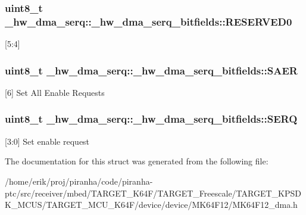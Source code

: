 \subsubsection[{\texorpdfstring{R\+E\+S\+E\+R\+V\+E\+D0}{RESERVED0}}]{\setlength{\rightskip}{0pt plus 5cm}uint8\+\_\+t \+\_\+hw\+\_\+dma\+\_\+serq\+::\+\_\+hw\+\_\+dma\+\_\+serq\+\_\+bitfields\+::\+R\+E\+S\+E\+R\+V\+E\+D0}\hypertarget{struct__hw__dma__serq_1_1__hw__dma__serq__bitfields_ad89ede54427929337a743845e97722fb}{}\label{struct__hw__dma__serq_1_1__hw__dma__serq__bitfields_ad89ede54427929337a743845e97722fb}
\mbox{[}5\+:4\mbox{]} 
\subsubsection[{\texorpdfstring{S\+A\+ER}{SAER}}]{\setlength{\rightskip}{0pt plus 5cm}uint8\+\_\+t \+\_\+hw\+\_\+dma\+\_\+serq\+::\+\_\+hw\+\_\+dma\+\_\+serq\+\_\+bitfields\+::\+S\+A\+ER}\hypertarget{struct__hw__dma__serq_1_1__hw__dma__serq__bitfields_a8cc35592d815f1752d4b73bddc3e80be}{}\label{struct__hw__dma__serq_1_1__hw__dma__serq__bitfields_a8cc35592d815f1752d4b73bddc3e80be}
\mbox{[}6\mbox{]} Set All Enable Requests 
\subsubsection[{\texorpdfstring{S\+E\+RQ}{SERQ}}]{\setlength{\rightskip}{0pt plus 5cm}uint8\+\_\+t \+\_\+hw\+\_\+dma\+\_\+serq\+::\+\_\+hw\+\_\+dma\+\_\+serq\+\_\+bitfields\+::\+S\+E\+RQ}\hypertarget{struct__hw__dma__serq_1_1__hw__dma__serq__bitfields_a1c8c8163f7adbfdb0c91821883d885c0}{}\label{struct__hw__dma__serq_1_1__hw__dma__serq__bitfields_a1c8c8163f7adbfdb0c91821883d885c0}
\mbox{[}3\+:0\mbox{]} Set enable request 

The documentation for this struct was generated from the following file\+:\begin{DoxyCompactItemize}
\item 
/home/erik/proj/piranha/code/piranha-\/ptc/src/receiver/mbed/\+T\+A\+R\+G\+E\+T\+\_\+\+K64\+F/\+T\+A\+R\+G\+E\+T\+\_\+\+Freescale/\+T\+A\+R\+G\+E\+T\+\_\+\+K\+P\+S\+D\+K\+\_\+\+M\+C\+U\+S/\+T\+A\+R\+G\+E\+T\+\_\+\+M\+C\+U\+\_\+\+K64\+F/device/device/\+M\+K64\+F12/M\+K64\+F12\+\_\+dma.\+h\end{DoxyCompactItemize}
